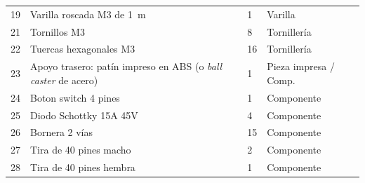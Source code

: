 \begin{table}[H]
\begin{tabular}{cL{5.6cm}L{1.6cm}L{3cm}}
19 & Varilla roscada M3 de \SI{1}{m} & 1 & Varilla \\
21 & Tornillos M3 & 8 & Tornillería \\
22 & Tuercas hexagonales M3 & 16 & Tornillería \\
23 & Apoyo trasero: patín impreso en ABS (o \emph{ball caster} de acero) & 1 & Pieza impresa / Comp. \\
24 & Boton switch 4 pines & 1 & Componente \\
25 & Diodo Schottky 15A 45V & 4 & Componente \\
26 & Bornera 2 vías & 15 & Componente \\
27 & Tira de 40 pines macho & 2 & Componente \\
28 & Tira de 40 pines hembra & 1 & Componente \\

\bottomrule
\bottomrule
\end{tabular}
\end{table}
